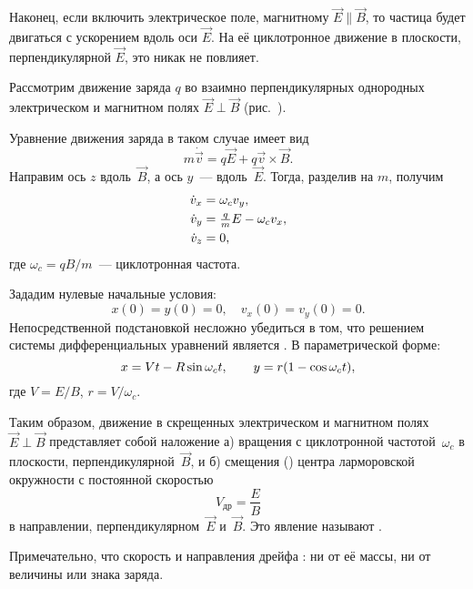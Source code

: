 
Наконец, если включить электрическое поле, 
магнитному $\vec{E}\parallel\vec{B}$, то частица будет двигаться с ускорением
вдоль оси $\vec{E}$. На её циклотронное движение в плоскости, перпендикулярной
$\vec{E}$, это никак не повлияет.


Рассмотрим движение заряда $q$ во взаимно перпендикулярных однородных
электрическом и магнитном полях $\vec{E}\perp\vec{B}$
(рис.~).

Уравнение движения заряда в таком случае имеет вид
\[
m\dot{\vec{v}} = q\vec{E} + q \vec{v}\times \vec{B}.
\]
Направим ось $z$ вдоль~$\vec{B}$, а ось $y$~--- вдоль~$\vec{E}$.
Тогда, разделив на $m$, получим
\begin{equation}
    \eqmark{3.9}
    \begin{aligned}
        \dot{v}_x&=\omega_c v_y,\\
        \dot{v}_y&=\tfrac{q}{m}E-\omega_c v_x,\\
        \dot{v}_z&=0,
\end{aligned}
\end{equation}
где $\omega_c = qB/m$~--- циклотронная частота.

Зададим нулевые начальные условия:
\[x(0)=y(0)=0,\quad v_x(0)=v_y(0)=0.\]
Непосредственной подстановкой несложно убедиться в том, что решением системы
дифференциальных уравнений является .
В параметрической форме:
\begin{equation}
    \eqmark{3.11}
    x = Vt - R\sin\omega_c t,\qquad y = r(1-\cos\omega_c t),
\end{equation}
где $V=E/B$, $r=V/\omega_c$.

Таким образом, движение в скрещенных электрическом и магнитном полях
$\vec{E}\perp \vec{B}$ представляет собой наложение
а) вращения с циклотронной частотой~$\omega_c$ в плоскости,
перпендикулярной~$\vec{B}$, и б) смещения () центра ларморовской
окружности с постоянной скоростью
\begin{equation}
    V_{др} = \frac{E}{B}
\end{equation}
в направлении, перпендикулярном~$\vec{E}$ и~$\vec{B}$. Это явление
называют .

Примечательно, что
скорость и направления дрейфа :
ни от её массы, ни от величины или знака заряда.

